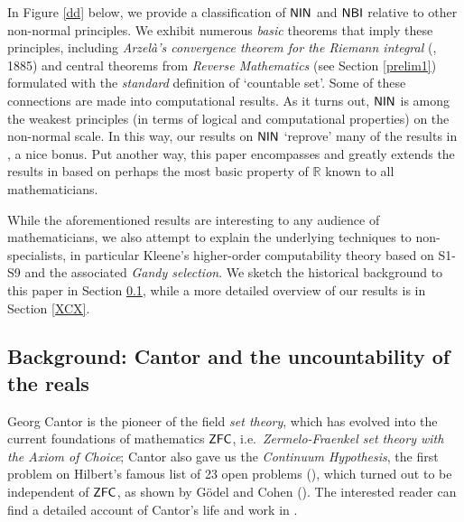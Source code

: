 \documentclass[reqno]{amsart}
\def\ZFC{\textup{\textsf{ZFC}}}
\def\R{{\mathbb  R}}
\def\NBI{\textup{\textsf{NBI}}}
\def\NIN{\textup{\textsf{NIN}}}
\numberwithin{equation}{section}
\numberwithin{thm}{section}
\begin{document}
In Figure \ref{dd} below, we provide a classification of $\NIN$ and $\NBI$ relative to other non-normal principles.  %
We exhibit numerous \emph{basic} theorems that imply these principles, including \emph{Arzel\`a's convergence theorem for the Riemann integral} (\cite{arse2}, 1885) and central theorems from \emph{Reverse Mathematics} (see Section \ref{prelim1}) formulated with the \emph{standard} definition of `countable set'.
Some of these connections are made into computational results. 
As it turns out, $\NIN$ is among the weakest principles (in terms of logical and computational properties) on the non-normal scale. 
In this way, our results on $\NIN$ `reprove' many of the results in \cites{dagsam, dagsamII, dagsamIII, dagsamV, dagsamVI ,dagsamVII}, a nice bonus.
Put another way, this paper encompasses and greatly extends the results in \cites{dagsam, dagsamII, dagsamIII, dagsamV, dagsamVI ,dagsamVII} based on perhaps the most basic property of $\R$ known to all mathematicians.  

\smallskip

While the aforementioned results are interesting to any audience of mathematicians, we also attempt to explain the underlying techniques to non-specialists, in particular Kleene's higher-order computability theory based on S1-S9 and the associated \emph{Gandy selection}.  
We sketch the historical background to this paper in Section \ref{kiko}, while a more detailed overview of our results is in Section \ref{XCX}.
\subsection{Background: Cantor and the uncountability of the reals}\label{kiko}
Georg Cantor is the pioneer of the field \emph{set theory}, which has evolved into the current foundations of mathematics $\ZFC$, i.e.\ \emph{Zermelo-Fraenkel set theory with the Axiom of Choice}; Cantor also gave us the \emph{Continuum Hypothesis}, the first problem on Hilbert's famous list of 23 open problems (\cites{hilbertendlich, hilbertlist}), which turned out to be independent of $\ZFC$, as shown by G\"odel and Cohen (\cites{cohen1, cohen2, goeset}).  
The interested reader can find a detailed account of Cantor's life and work in \cite{dauben1}. 

\smallskip
\end{document}
